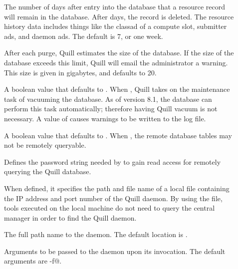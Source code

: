 \begin{description}
\item[] \label{param:QuillResourceHistoryDuration}
  The number of days after entry into the database that a resource record will
  remain in the database.
  After  days, the record is 
  deleted.
  The resource history data includes things like the classad of a compute slot,
  submitter ads, and daemon ads.
  The default is 7, or one week. 

\item[] \label{param:QuillDBSizeLimit}
  After each purge, Quill estimates the size of the database. 
  If the size of the database exceeds this limit, Quill will email the
  administrator a warning. 
  This size is given in gigabytes, and defaults to 20. 

\item[]
  \label{param:QuillManageVacuum}
  A boolean value that defaults to .
  When , Quill takes on the maintenance task of vacuuming
  the database. As of  version 8.1, the database
  can perform this task automatically; therefore having Quill vacuum
  is not necessary.
  A value of  causes warnings to be written to the log file.

\item[]
  \label{param:QuillIsRemotelyQueryable}
  A boolean value that defaults to .
  When , the remote database tables may not be remotely
  queryable.

\item[] \label{param:QuillDBQueryPassword}
  Defines the password string needed by  to gain read
  access for remotely querying the Quill database.

\item[] \label{param:QuillAddressFile}
  When defined, it specifies the path and file name of a local file
  containing the IP address and port number of the Quill daemon.
  By using the file, tools executed on the local machine do not need
  to query the central manager in order to find the Quill daemon.

\item[] \label{param:DBMSD}  The full path name to the
   daemon.
  The default location is .

\item[] \label{param:DBMSDArgs} Arguments
  to be passed to the  daemon upon its invocation.
  The default arguments are \verb@-f@.


\end{description}
